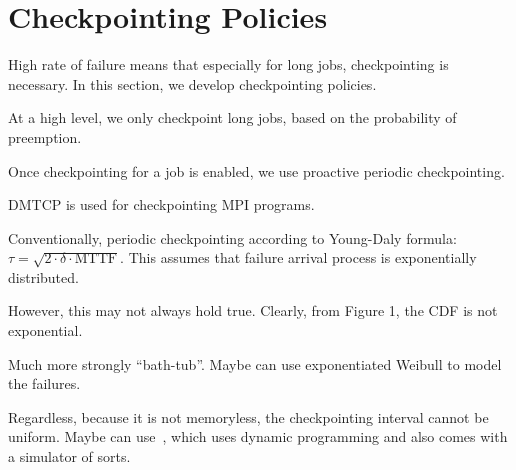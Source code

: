 \section{Checkpointing Policies}

High rate of failure means that especially for long jobs, checkpointing is necessary.
In this section, we develop checkpointing policies.

At a high level, we only checkpoint long jobs, based on the probability of preemption.

Once checkpointing for a job is enabled, we use proactive periodic checkpointing.

DMTCP is used for checkpointing MPI programs.

Conventionally, periodic checkpointing according to Young-Daly formula: $\tau=\sqrt{2\cdot\delta\cdot\text{MTTF}}$.
This assumes that failure arrival process is exponentially distributed.

However, this may not always hold true.
Clearly, from Figure 1, the CDF is not exponential.

Much more strongly ``bath-tub''. Maybe can use exponentiated Weibull to model the failures.

Regardless, because it is not memoryless, the checkpointing interval cannot be uniform. Maybe can use~\cite{bougeret_checkpointing_2011}, which uses dynamic programming and also comes with a simulator of sorts. 




